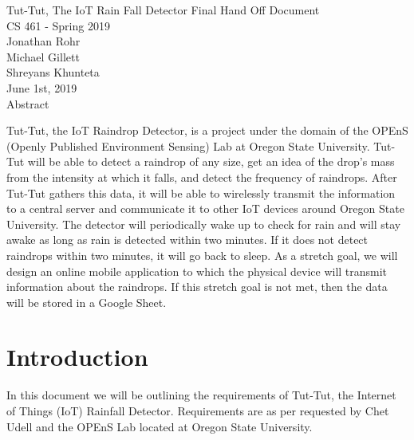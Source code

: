 \documentclass[letterpaper,10pt,draftclsnofoot,onecolumn]{article}
\begin{document}
\begin{titlepage}
\vspace*{\fill}
\begin{center}
{\Large Tut-Tut, The IoT Rain Fall Detector Final Hand Off Document}
\\[0.3cm]

{\large CS 461 - Spring 2019}
\\[0.3cm]

{\large Jonathan Rohr}
\\[0.3cm]

{\large Michael Gillett}
\\[0.3cm]

{\large Shreyans Khunteta}
\\[0.3cm]

{\large June 1st, 2019}
\\[1cm]

{\Large Abstract}
\end{center}
Tut-Tut, the IoT Raindrop Detector, is a project under the domain of the OPEnS (Openly Published Environment Sensing) Lab at Oregon State University. Tut-Tut will be able to detect a raindrop of any size, get an idea of the drop's mass from the intensity at which it falls, and detect the frequency of raindrops. After Tut-Tut gathers this data, it will be able to wirelessly transmit the information to a central server and communicate it to other IoT devices around Oregon State University. The detector will periodically wake up to check for rain and will stay awake as long as rain is detected within two minutes. If it does not detect raindrops within two minutes, it will go back to sleep. As a stretch goal, we will design an online mobile application to which the physical device will transmit information about the raindrops. If this stretch goal is not met, then the data will be stored in a Google Sheet.
\vspace*{\fill}
\end{titlepage}

\tableofcontents

\pagebreak

\section{Introduction}
In this document we will be outlining the requirements of Tut-Tut, the Internet of Things (IoT) Rainfall Detector. Requirements are as per requested by Chet Udell and the OPEnS Lab located at Oregon State University.
\end{document}
